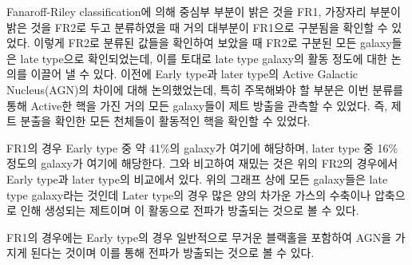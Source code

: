 \documentclass[a4paper,11pt]{article}
\begin{document}
Fanaroff-Riley classification에 의해 중심부 부분이 밝은 것을 FR1, 가장자리 부분이 밝은 것을 FR2로 두고 분류하였을 때 거의 대부분이 FR1으로 구분됨을 확인할 수 있었다. 
이렇게 FR2로 분류된 값들을 확인하여 보았을 때 FR2로 구분된 모든 galaxy들은 late type으로 확인되었는데, 이를 토대로 late type galaxy의 활동 정도에 대한 논의를 이끌어 낼 수 있다.
이전에 Early type과 later type의 Active Galactic Nucleus(AGN)의 차이에 대해 논의했었는데, 특히 주목해봐야 할 부분은 이번 분류를 통해 Active한 핵을 가진 거의 모든 galaxy들이 제트 방출을 관측할 수 있었다. 
즉, 제트 분출을 확인한 모든 천체들이 활동적인 핵을 확인할 수 있었다.

FR1의 경우 Early type 중 약 41\%의 galaxy가 여기에 해당하며, later type 중 16\% 정도의 galaxy가 여기에 해당한다.
그와 비고하여 재밌는 것은 위의 FR2의 경우에서 Early type과 later type의 비교에서 있다. 
위의 그래프 상에 모든 galaxy들은 late type galaxy라는 것인데 Later type의 경우 많은 양의 차가운 가스의 수축이나 압축으로 인해 생성되는 제트이며 
이 활동으로 전파가 방출되는 것으로 볼 수 있다. 

FR1의 경우에는 Early type의 경우 일반적으로 무거운 블랙홀을 포함하여 AGN을 가지게 된다는 것이며 이를 통해 전파가 방출되는 것으로 볼 수 있다.
\end{document}
